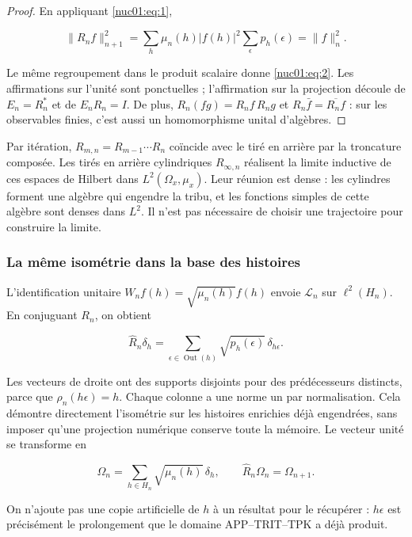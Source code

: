 \begin{proof}
En appliquant \eqref{nuc01:eq:1},


\[
\|R_nf\|_{n+1}^2
=\sum_h\mu_n(h)|f(h)|^2\sum_\epsilon p_h(\epsilon)
=\|f\|_n^2.
\]

Le même regroupement dans le produit scalaire donne \eqref{nuc01:eq:2}. Les affirmations sur l’unité sont ponctuelles ; l’affirmation sur la projection découle de \(E_n=R_n^*\) et de \(E_nR_n=I\). De plus, \(R_n(fg)=R_nf\,R_ng\) et \(R_n\bar f=\overline{R_nf}\) : sur les observables finies, c’est aussi un homomorphisme unital d’algèbres.

\end{proof}

Par itération, \(R_{m,n}=R_{m-1}\cdots R_n\) coïncide avec le tiré en arrière par la troncature composée. Les tirés en arrière cylindriques \(R_{\infty,n}\) réalisent la limite inductive de ces espaces de Hilbert dans \(L^2(\Omega_x,\mu_x)\). Leur réunion est dense : les cylindres forment une algèbre qui engendre la tribu, et les fonctions simples de cette algèbre sont denses dans \(L^2\). Il n’est pas nécessaire de choisir une trajectoire pour construire la limite.

\subsubsection{La même isométrie dans la base des histoires}

L’identification unitaire \(W_nf(h)=\sqrt{\mu_n(h)}f(h)\) envoie \(\mathscr L_n\) sur \(\ell^2(H_n)\). En conjuguant \(R_n\), on obtient

\begin{equation}
\widehat R_n\delta_h
=\sum_{\epsilon\in\operatorname{Out}(h)}\sqrt{p_h(\epsilon)}\,\delta_{h\epsilon}.
\label{nuc01:eq:3}
\end{equation}

Les vecteurs de droite ont des supports disjoints pour des prédécesseurs distincts, parce que \(\rho_n(h\epsilon)=h\). Chaque colonne a une norme un par normalisation. Cela démontre directement l’isométrie sur les histoires enrichies déjà engendrées, sans imposer qu’une projection numérique conserve toute la mémoire. Le vecteur unité se transforme en

\[
\Omega_n=\sum_{h\in H_n}\sqrt{\mu_n(h)}\,\delta_h,
\qquad \widehat R_n\Omega_n=\Omega_{n+1}.
\]

On n’ajoute pas une copie artificielle de \(h\) à un résultat pour le récupérer : \(h\epsilon\) est précisément le prolongement que le domaine APP–TRIT–TPK a déjà produit.


